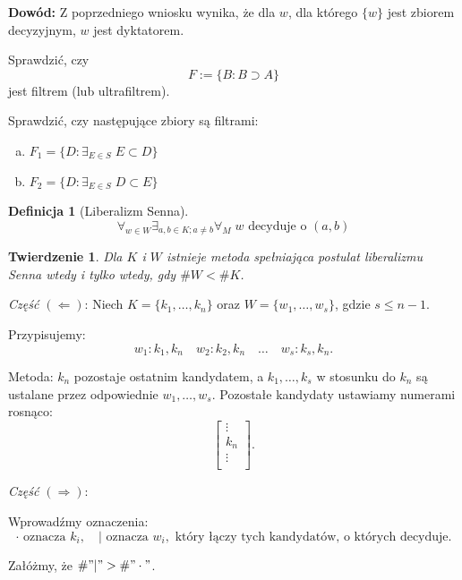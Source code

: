 \documentclass[12pt,a4paper]{article}
\theoremstyle{break}
\newtheorem{definition}{Definicja}[section]
\newtheorem{theorem}{Twierdzenie}[section]
\begin{document}
	\noindent \textbf{Dowód:} Z poprzedniego wniosku wynika, że dla $w$, dla którego $\{w\}$ jest zbiorem decyzyjnym, $w$ jest dyktatorem.
	\begin{zad}
		Sprawdzić, czy 
		\[
		F := \{B : B \supset A\}
		\]
		jest filtrem (lub ultrafiltrem).
	\end{zad}
	
	\begin{zad}
		Sprawdzić, czy następujące zbiory są filtrami:
		\begin{enumerate}[a)]
			\item $F_1 = \{D : \exists_{E \in S} \; E \subset D\}$
			\item $F_2 = \{D : \exists_{E \in S} \; D \subset E\}$
		\end{enumerate}
	\end{zad}
	
	\begin{definition}[Liberalizm Senna]
		\[
		\forall_{w \in W} \exists_{a, b \in K; a \neq b} \forall_M \; w \text{ decyduje o } (a, b)
		\]
	\end{definition}
	
	\begin{theorem}
		Dla $K$ i $W$ istnieje metoda spełniająca postulat liberalizmu Senna \textit{wtedy i tylko wtedy}, gdy $\# W < \# K$.
	\end{theorem}
	
	\textit{Część $(\Leftarrow)$}: Niech $K = \{k_1, \dots, k_n\}$ oraz $W = \{w_1, \dots, w_s\}$, gdzie $s \leq n - 1$. 
		
		Przypisujemy:
		\[
		w_1 : k_1, k_n \quad w_2 : k_2, k_n \quad \dots \quad w_s : k_s, k_n.
		\]
		
		Metoda: $k_n$ pozostaje ostatnim kandydatem, a $k_1, \dots, k_s$ w stosunku do $k_n$ są ustalane przez odpowiednie $w_1, \dots, w_s$. Pozostałe kandydaty ustawiamy numerami rosnąco:
		\[
		\begin{bmatrix}
			\vdots \\
			k_n \\
			\vdots \\
		\end{bmatrix}.
		\]
		
		\textit{Część $(\Rightarrow)$}: %
		
		Wprowadźmy oznaczenia:
		\[
		\cdot \text{ oznacza } k_i, \quad | \text{ oznacza } w_i, \text{ który łączy tych kandydatów, o których decyduje}.
		\]
		
		Załóżmy, że $\# "|" > \# "\cdot"$.
		
\end{document}
